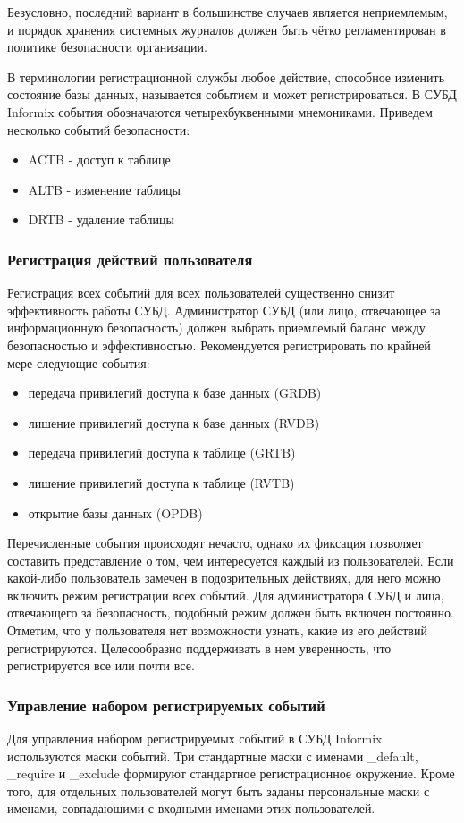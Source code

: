 Безусловно, последний вариант в большинстве случаев является неприемлемым, и порядок хранения
системных журналов должен быть чётко регламентирован в политике безопасности организации.

В терминологии регистрационной службы любое действие, способное изменить состояние базы данных,
называется событием и может регистрироваться. В СУБД Informix события обозначаются
четырехбуквенными мнемониками. Приведем несколько событий безопасности:
\begin{itemize}
    \item ACTB - доступ к таблице
    \item ALTB - изменение таблицы
    \item DRTB - удаление таблицы
\end{itemize}


\subsubsection{Регистрация действий пользователя}
Регистрация всех событий для всех пользователей существенно снизит эффективность работы СУБД.
Администратор СУБД (или лицо, отвечающее за информационную безопасность) должен выбрать приемлемый
баланс между безопасностью и эффективностью.
Рекомендуется регистрировать по крайней мере следующие события:
\begin{itemize}
    \item передача привилегий доступа к базе данных (GRDB)
    \item лишение привилегий доступа к базе данных (RVDB)
    \item передача привилегий доступа к таблице (GRTB)
    \item лишение привилегий доступа к таблице (RVTB)
    \item открытие базы данных (OPDB)
\end{itemize}

Перечисленные события происходят нечасто, однако их фиксация позволяет составить представление о
том, чем интересуется каждый из пользователей. Если какой-либо пользователь замечен в
подозрительных действиях, для него можно включить режим регистрации всех событий. Для
администратора СУБД и лица, отвечающего за безопасность, подобный режим должен быть включен
постоянно.
Отметим, что у пользователя нет возможности узнать, какие из его действий регистрируются.
Целесообразно поддерживать в нем уверенность, что регистрируется все или почти все.


\subsubsection{Управление набором регистрируемых событий}
Для управления набором регистрируемых событий в СУБД Informix используются маски событий.
Три стандартные маски с именами \_default, \_require и \_exclude формируют стандартное
регистрационное окружение. Кроме того, для отдельных пользователей могут быть заданы персональные
маски с именами, совпадающими с входными именами этих пользователей.

